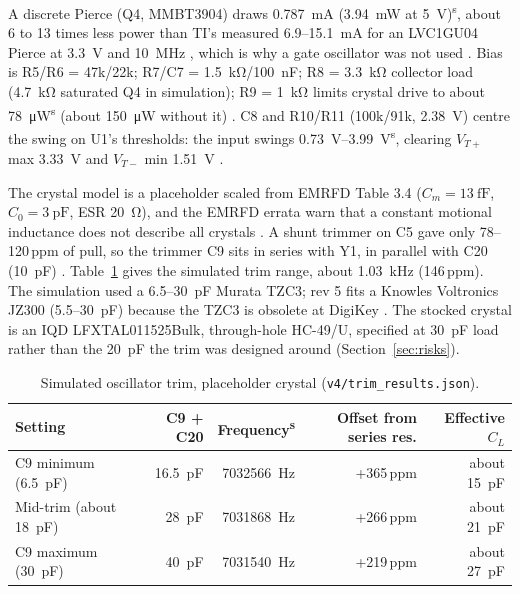 \documentclass[11pt,letterpaper]{article}
\newcommand{\simv}{\textsuperscript{s}}
\begin{document}
A discrete Pierce (Q4, MMBT3904) draws \SI{0.787}{\milli\ampere} (\SI{3.94}{\milli\watt} at \SI{5}{\volt})\simv{}, about 6 to 13 times less power than TI's measured 6.9--\SI{15.1}{\milli\ampere} for an LVC1GU04 Pierce at \SI{3.3}{\volt} and \SI{10}{\mega\hertz} \cite[Table B-2]{tiSZZA043}, which is why a gate oscillator was not used \cite{projsim,projnotes}. Bias is R5/R6 = 47k/22k; R7/C7 = \SI{1.5}{\kilo\ohm}/\SI{100}{\nano\farad}; R8 = \SI{3.3}{\kilo\ohm} collector load (\SI{4.7}{\kilo\ohm} saturated Q4 in simulation); R9 = \SI{1}{\kilo\ohm} limits crystal drive to about \SI{78}{\micro\watt}\simv{} (about \SI{150}{\micro\watt} without it) \cite{projnotes}. C8 and R10/R11 (100k/91k, \SI{2.38}{\volt}) centre the swing on U1's thresholds: the input swings \SIrange{0.73}{3.99}{\volt}\simv{}, clearing $V_{T+}$ max \SI{3.33}{\volt} and $V_{T-}$ min \SI{1.51}{\volt} \cite{tiLVC1G17,projsim}.

The crystal model is a placeholder scaled from EMRFD Table 3.4 \cite[p.~3.17]{emrfd} ($C_m=\SI{13}{\femto\farad}$, $C_0=\SI{3}{\pico\farad}$, ESR \SI{20}{\ohm}), and the EMRFD errata warn that a constant motional inductance does not describe all crystals \cite[p.~4.15]{emrfderrata}. A shunt trimmer on C5 gave only 78--120\,ppm of pull, so the trimmer C9 sits in series with Y1, in parallel with C20 (\SI{10}{\pico\farad}) \cite{projnotes}. Table~\ref{tab:trim} gives the simulated trim range, about \SI{1.03}{\kilo\hertz} (146\,ppm). The simulation used a 6.5--\SI{30}{\pico\farad} Murata TZC3; rev 5 fits a Knowles Voltronics JZ300 (5.5--\SI{30}{\pico\farad}) because the TZC3 is obsolete at DigiKey \cite{knowlesJ}. The stocked crystal is an IQD LFXTAL011525Bulk, through-hole HC-49/U, specified at \SI{30}{\pico\farad} load rather than the \SI{20}{\pico\farad} the trim was designed around (Section~\ref{sec:risks}).

\begin{table}[h]
\centering\small
\caption{Simulated oscillator trim, placeholder crystal \cite{projsim} (\texttt{v4/trim\_results.json}).}\label{tab:trim}
\begin{tabular}{@{}lrrrr@{}}
\toprule
Setting & C9 + C20 & Frequency\simv & Offset from series res. & Effective $C_L$ \\ \midrule
C9 minimum (\SI{6.5}{\pico\farad}) & \SI{16.5}{\pico\farad} & \SI{7032566}{\hertz} & +365\,ppm & about \SI{15}{\pico\farad} \\
Mid-trim (about \SI{18}{\pico\farad}) & \SI{28}{\pico\farad} & \SI{7031868}{\hertz} & +266\,ppm & about \SI{21}{\pico\farad} \\
C9 maximum (\SI{30}{\pico\farad}) & \SI{40}{\pico\farad} & \SI{7031540}{\hertz} & +219\,ppm & about \SI{27}{\pico\farad} \\
\bottomrule
\end{tabular}
\end{table}
\end{document}

